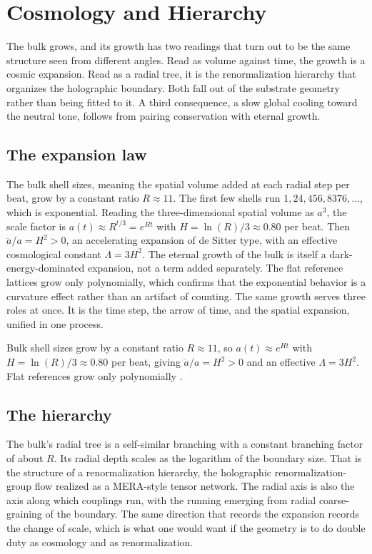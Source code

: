 \section{Cosmology and Hierarchy}

The bulk grows, and its growth has two readings that turn out to be the same structure seen from different angles. Read as volume against time, the growth is a cosmic expansion. Read as a radial tree, it is the renormalization hierarchy that organizes the holographic boundary. Both fall out of the substrate geometry rather than being fitted to it. A third consequence, a slow global cooling toward the neutral tone, follows from pairing conservation with eternal growth.

\subsection{The expansion law}

The bulk shell sizes, meaning the spatial volume added at each radial step per beat, grow by a constant ratio $R \approx 11$. The first few shells run $1, 24, 456, 8376, \dots$, which is exponential. Reading the three-dimensional spatial volume as $a^3$, the scale factor is $a(t) \approx R^{t/3} = e^{Ht}$ with $H = \ln(R)/3 \approx 0.80$ per beat. Then $\ddot{a}/a = H^2 > 0$, an accelerating expansion of de Sitter type, with an effective cosmological constant $\Lambda = 3H^2$. The eternal growth of the bulk is itself a dark-energy-dominated expansion, not a term added separately. The flat reference lattices grow only polynomially, which confirms that the exponential behavior is a curvature effect rather than an artifact of counting. The same growth serves three roles at once. It is the time step, the arrow of time, and the spatial expansion, unified in one process.

\begin{result}
Bulk shell sizes grow by a constant ratio $R \approx 11$, so $a(t) \approx e^{Ht}$ with $H = \ln(R)/3 \approx 0.80$ per beat, giving $\ddot{a}/a = H^2 > 0$ and an effective $\Lambda = 3H^2$. Flat references grow only polynomially \cite{pollard2026vibetest}.
\end{result}

\subsection{The hierarchy}

The bulk's radial tree is a self-similar branching with a constant branching factor of about $R$. Its radial depth scales as the logarithm of the boundary size. That is the structure of a renormalization hierarchy, the holographic renormalization-group flow realized as a MERA-style tensor network. The radial axis is also the axis along which couplings run, with the running emerging from radial coarse-graining of the boundary. The same direction that records the expansion records the change of scale, which is what one would want if the geometry is to do double duty as cosmology and as renormalization.


